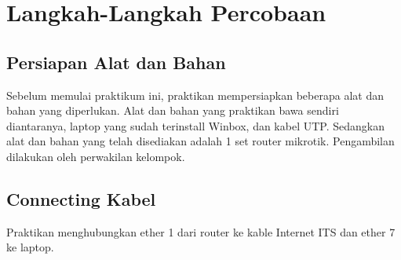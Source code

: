 \section{Langkah-Langkah Percobaan}
\subsection{Persiapan Alat dan Bahan}
Sebelum memulai praktikum ini, praktikan mempersiapkan beberapa alat dan bahan yang diperlukan. Alat dan bahan yang praktikan bawa sendiri diantaranya, laptop yang sudah terinstall Winbox, dan kabel UTP. Sedangkan alat dan bahan yang telah disediakan adalah 1 set router mikrotik. Pengambilan dilakukan oleh perwakilan kelompok.

\subsection{Connecting Kabel}
Praktikan menghubungkan ether 1 dari router ke kable Internet ITS dan ether 7 ke laptop.

